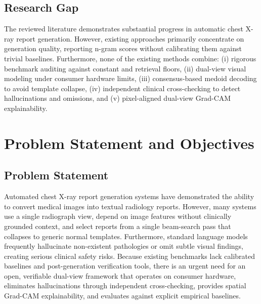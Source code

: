 \documentclass[12pt,a4paper]{report}
\begin{document}
\section{Research Gap}
The reviewed literature demonstrates substantial progress in automatic chest X-ray report generation. However, existing approaches primarily concentrate on generation quality, reporting n-gram scores without calibrating them against trivial baselines. Furthermore, none of the existing methods combine: (i) rigorous benchmark auditing against constant and retrieval floors, (ii) dual-view visual modeling under consumer hardware limits, (iii) consensus-based medoid decoding to avoid template collapse, (iv) independent clinical cross-checking to detect hallucinations and omissions, and (v) pixel-aligned dual-view Grad-CAM explainability.

\chapter{Problem Statement and Objectives}

\section{Problem Statement}
Automated chest X-ray report generation systems have demonstrated the ability to convert medical images into textual radiology reports. However, many systems use a single radiograph view, depend on image features without clinically grounded context, and select reports from a single beam-search pass that collapses to generic normal templates. Furthermore, standard language models frequently hallucinate non-existent pathologies or omit subtle visual findings, creating serious clinical safety risks. Because existing benchmarks lack calibrated baselines and post-generation verification tools, there is an urgent need for an open, verifiable dual-view framework that operates on consumer hardware, eliminates hallucinations through independent cross-checking, provides spatial Grad-CAM explainability, and evaluates against explicit empirical baselines.
\end{document}
